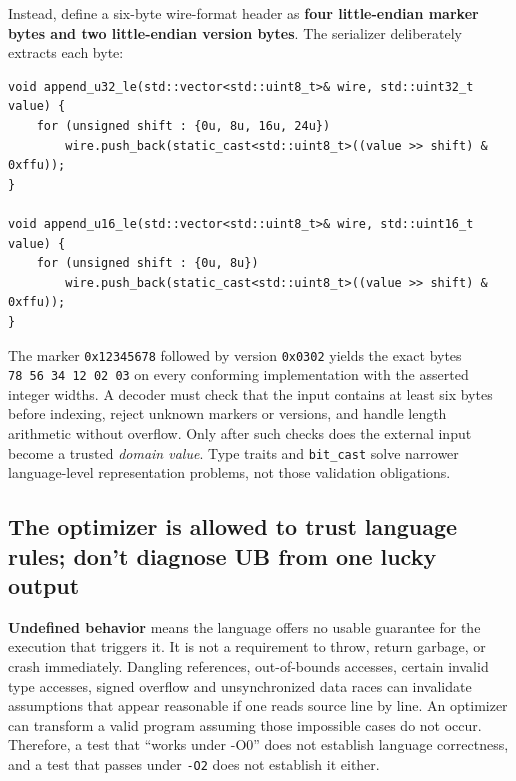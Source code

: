Instead, define a six-byte wire-format header as \textbf{four little-endian marker bytes and two little-endian version bytes}. The serializer deliberately extracts each byte:

\begin{verbatim}
void append_u32_le(std::vector<std::uint8_t>& wire, std::uint32_t value) {
    for (unsigned shift : {0u, 8u, 16u, 24u})
        wire.push_back(static_cast<std::uint8_t>((value >> shift) & 0xffu));
}

void append_u16_le(std::vector<std::uint8_t>& wire, std::uint16_t value) {
    for (unsigned shift : {0u, 8u})
        wire.push_back(static_cast<std::uint8_t>((value >> shift) & 0xffu));
}
\end{verbatim}

The marker \texttt{0x12345678} followed by version \texttt{0x0302} yields the exact bytes \texttt{78\ 56\ 34\ 12\ 02\ 03} on every conforming implementation with the asserted integer widths. A decoder must check that the input contains at least six bytes before indexing, reject unknown markers or versions, and handle length arithmetic without overflow. Only after such checks does the external input become a trusted \emph{domain value}. Type traits and \texttt{bit\_cast} solve narrower language-level representation problems, not those validation obligations.

\subsection{The optimizer is allowed to trust language rules; don't diagnose UB from one lucky output}\label{05-engine-i-ch004-the-optimizer-is-allowed-to-trust-language-rules-dont-diagnose-ub-from-one-lucky-output}

\hypertarget{05-engine-i-ch004-the-optimizer-is-allowed-to-trust-language-rules-dont-diagnose-ub-from-one-lucky-output}{}

\textbf{Undefined behavior} means the language offers no usable guarantee for the execution that triggers it. It is not a requirement to throw, return garbage, or crash immediately. Dangling references, out-of-bounds accesses, certain invalid type accesses, signed overflow and unsynchronized data races can invalidate assumptions that appear reasonable if one reads source line by line. An optimizer can transform a valid program assuming those impossible cases do not occur. Therefore, a test that ``works under -O0'' does not establish language correctness, and a test that passes under \texttt{-O2} does not establish it either.

